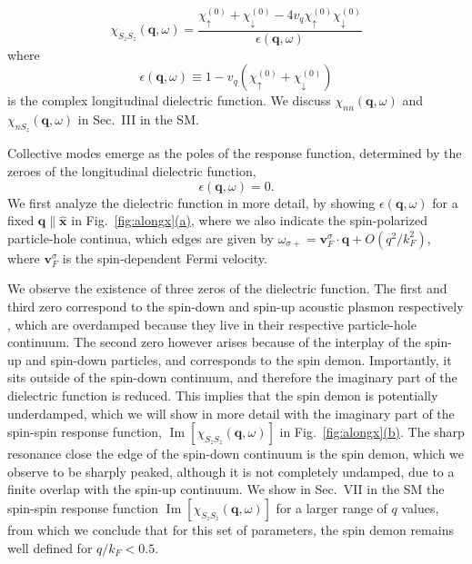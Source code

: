 \documentclass[aps,prl,reprint,twocolumns,superscriptaddress]{revtex4-2}
\DeclareMathOperator{\Imm}{Im}
\newcommand{\xx}{\hat{\bm{x}}}
\newcommand{\kF}{k_{F}}
\newcommand{\subfigref}[2]{Fig.~\hyperref[#1]{\ref*{#1}#2}}
\begin{document}
	\begin{equation}
		\chi_{S_zS_z}(\bm q,\omega)=\frac{\chi_\uparrow^{(0)}+\chi_\downarrow^{(0)}-4v_q\chi_\uparrow^{(0)}\chi_\downarrow^{(0)}}{\epsilon(\bm q,\omega)}
	\end{equation}
	where 
	\begin{equation}
		\epsilon(\bm q,\omega) \equiv 1 - v_q \left(\chi_\uparrow^{(0)}+\chi_\downarrow^{(0)}\right)
	\end{equation}
	is the complex longitudinal dielectric function. We discuss $\chi_{nn}(\bm q,\omega)$ and $\chi_{nS_z}(\bm q,\omega)$ in Sec.~III in the SM. 
	
	Collective modes emerge as the poles of the response function, determined by the zeroes of the longitudinal dielectric function, 
	\begin{equation}
		\epsilon(\bm q,\omega) = 0. \label{eq:poles}
	\end{equation}
	We first analyze the dielectric function in more detail, by showing $\epsilon(\bm q,\omega)$ for a fixed $\bm q\parallel \xx$ in \subfigref{fig:alongx}{(a)}, where we also indicate the spin-polarized particle-hole continua, which edges are given by $\omega_{\sigma+}=\bm v_F^\sigma\cdot \bm q + O(q^2/\kF^2)$, where $\bm v_F^\sigma$ is the spin-dependent Fermi velocity.
	
	We observe the existence of three zeros of the dielectric function. The first and third zero correspond to the spin-down and spin-up acoustic plasmon respectively \cite{kamenevFieldTheoryNonEquilibrium2023}, which are overdamped because they live in their respective particle-hole continuum. The second zero however arises because of the interplay of the spin-up and spin-down particles, and corresponds to the spin demon. Importantly, it sits outside of the spin-down continuum, and therefore the imaginary part of the dielectric function is reduced. This implies that the spin demon is potentially underdamped, which we will show in more detail with the imaginary part of the spin-spin response function, $\Imm[\chi_{S_zS_z}(\bm q,\omega)]$ in \subfigref{fig:alongx}{(b)}. The sharp resonance close the edge of the spin-down continuum is the spin demon, which we observe to be sharply peaked, although it is not completely undamped, due to a finite overlap with the spin-up continuum. We show in Sec.~VII in the SM the spin-spin response function $\Imm[\chi_{S_zS_z}(\bm q,\omega)]$ for a larger range of $q$ values, from which we conclude that for this set of parameters, the spin demon remains well defined for $q/\kF<0.5$.
	
\end{document}
